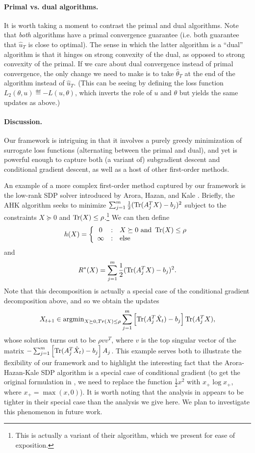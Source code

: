 \documentclass{article} %
\begin{document}
\paragraph{Primal vs. dual algorithms.}
It is worth taking a moment to contrast the primal and dual algorithms. Note 
that \emph{both} algorithms have a primal convergence guarantee (i.e. both 
guarantee that $\hat{u}_T$ is close to optimal). The sense in which the latter 
algorithm is a ``dual'' algorithm is that it hinges on strong convexity of 
the dual, as opposed to strong convexity of the primal. If we care about dual 
convergence instead of primal convergence, the only change we need to make 
is to take $\hat{\theta}_T$ at the end of the algorithm instead of $\hat{u}_T$. 
(This can be seeing by defining the loss function $L_2(\theta, u) \eqdef -L(u, \theta)$, 
which inverts the role of $u$ and $\theta$ but yields the same updates as above.)

\paragraph{Discussion.}
Our framework is intriguing in that it involves a purely greedy minimization 
of surrogate loss functions (alternating between the primal and dual), and yet 
is powerful enough to capture both (a variant of) subgradient descent and 
conditional gradient descent, as well as a host of other first-order methods. 

An example of a more complex first-order method captured by our framework is 
the low-rank SDP solver introduced by Arora, Hazan, and Kale \cite{aroraSDP}. 
Briefly, the AHK algorithm seeks to minimize 
$\sum_{j=1}^m \frac{1}{2}(\operatorname{Tr}(A_j^TX)-b_j)^2$ subject to the 
constraints $X \succeq 0$ and $\operatorname{Tr}(X) \leq \rho$.\footnote{This is actually a 
variant of their algorithm, which we present for ease of exposition.} We 
can then define 
\[ h(X) = \left\{ \begin{array}{ccl} 0 & : & X \succeq 0\mathrm{ \ and \ }\operatorname{Tr}(X) \leq \rho \\ \infty & : & \mathrm{else} \end{array} \right.\]
and
\[ R^*(X) = \sum_{j=1}^m \frac{1}{2}(\operatorname{Tr}(A_j^TX)-b_j)^2. \]
Note that this decomposition is actually a special case of the conditional 
gradient decomposition above, and so we obtain the updates 
\[ X_{t+1} \in \operatorname{argmin}_{X \succeq 0, Tr(X) \leq \rho} \sum_{j=1}^m \left[\operatorname{Tr}(A_j^T\hat{X}_t)-b_j\right]\operatorname{Tr}(A_j^TX), \]
whose solution turns out to be $\rho vv^T$, where $v$ is the top singular 
vector of the matrix
$-\sum_{j=1}^m \left[\operatorname{Tr}(A_j^T\hat{X}_t)-b_j\right]A_j$. This example serves both 
to illustrate the flexibility of our framework and to highlight the interesting 
fact that the Arora-Hazan-Kale SDP algorithm is a special case of conditional 
gradient (to get the original formulation in \cite{aroraSDP}, we need to replace 
the function $\frac{1}{2}x^2$ with $x_{+}\log x_{+}$, where $x_{+} = \max(x,0)$). 
It is worth noting that the analysis in \cite{aroraSDP} appears to be tighter in 
their special case than the analysis we give here. We plan to investigate this 
phenomenon in future work.
\end{document}
